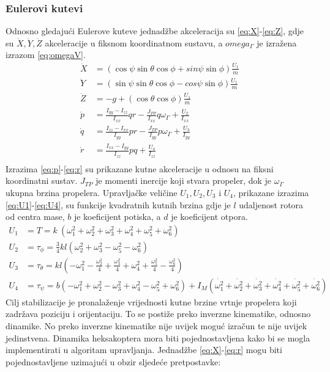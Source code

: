 \documentclass[times, utf8, diplomski]{fer}
\begin{document}
\subsubsection{Eulerovi kutevi}
Odnosno gledajući Eulerove kuteve jednadžbe akceleracija su \ref{eq:X}-\ref{eq:Z}, gdje su $\ddot{X}, \ddot{Y}, \ddot{Z}$ akceleracije u fiksnom koordinatnom sustavu, a $omega_{\Gamma}$ je izražena izrazom \ref{eq:omegaV}.
\begin{align}
\ddot{X} &= (\cos\psi \sin\theta \cos\phi + sin\psi \sin\phi)\frac{U_1}{m} \label{eq:X} \\
\ddot{Y} &= (\sin\psi \sin\theta \cos\phi - cos\psi \sin\phi)\frac{U_1}{m} \label{eq:Y} \\
\ddot{Z} &= -g + (\cos\theta \cos\phi)\frac{U_1}{m} \label{eq:Z} \\
\dot{p} &= \frac{I_{yy}-I_{zz}}{I_{xx}}qr - \frac{J_{TP}}{I_{xx}}q\omega_{\Gamma} + \frac{U_2}{I_{xx}} \label{eq:p} \\
\dot{q} &= \frac{I_{zz}-I_{xx}}{I_{yy}}pr - \frac{J_{TP}}{I_{yy}}p\omega_{\Gamma} + \frac{U_3}{I_{yy}} \label{eq:q} \\
\dot{r} &= \frac{I_{xx}-I_{yy}}{I_{zz}}pq  + \frac{U_4}{I_{zz}} \label{eq:r} \\
\end{align}
Izrazima \ref{eq:p}-\ref{eq:r} su prikazane kutne akceleracije u odnosu na fiksni koordinatni sustav. $J_{TP}$ je momenti inercije koji stvara propeler, dok je $\omega_{\Gamma}$ ukupna brzina propelera.  
Upravljačke veličine $U_1, U_2, U_3$ i $U_4$, prikazane izrazima \ref{eq:U1}-\ref{eq:U4}, su funkcije kvadratnih kutnih brzina gdje je $l$ udaljenost rotora od centra mase, $b$ je koeficijent potiska, a $d$ je koeficijent otpora.
\begin{align}
U_1 &= T = k~(\omega^2_1+\omega^2_2 +\omega^2_3+\omega^2_4+\omega^2_5+\omega^2_6) \label{eq:U1} \\
U_2 &= \tau_{\phi} =\frac{3}{4}kl(\omega^2_2+\omega^2_3-\omega^2_5-\omega^2_6) \label{eq:U2} \\
U_3 &= \tau_{\theta} = kl(-\omega^2_1-\frac{\omega^2_2}{4}+\frac{\omega^2_3}{4}+\omega^2_4+\frac{\omega^2_5}{4}-\frac{\omega^2_6}{4}) \label{eq:U3} \\
U_4 &= \tau_{\psi}= b(-\omega^2_1+\omega^2_2-\omega^2_3+\omega^2_4-\omega^2_5+\omega^2_6)+I_M(\dot{\omega^2_1}+\dot{\omega^2_2}+\dot{\omega^2_3}+\dot{\omega^2_4}+\dot{\omega^2_5}+\dot{\omega^2_6}) \label{eq:U4} 
\end{align}
Cilj stabilizacije je pronalaženje vrijednosti kutne brzine vrtnje propelera koji zadržava poziciju i orijentaciju. To se postiže preko inverzne kinematike, odnosno dinamike. No preko inverzne kinematike nije uvijek moguć izračun te nije uvijek jedinstvena. Dinamika heksakoptera mora biti pojednostavljena kako bi se mogla implementirati u algoritam upravljanja. Jednadžbe \ref{eq:X}-\ref{eq:r} mogu biti pojednostavljene uzimajući u obzir sljedeće pretpostavke:
\end{document}
